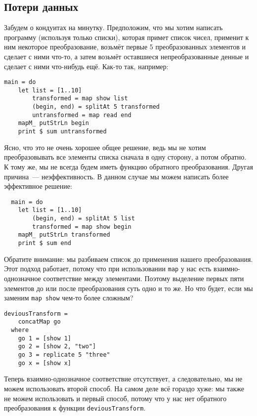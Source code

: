 \subsection{Потери данных} 
Забудем о кондуитах на минутку. Предположим, что мы хотим написать программу (используя 
только списки), которая примет список чисел, применит к ним некоторое преобразование,
возьмёт первые 5 преобразованных элементов и сделает с ними что-то, а затем возьмёт оставшиеся
непреобразованные денные и сделает с ними что-нибудь ещё. Как-то так, например:
\begin{lstlisting}
main = do
    let list = [1..10]
        transformed = map show list
        (begin, end) = splitAt 5 transformed
        untransformed = map read end
    mapM_ putStrLn begin
    print $ sum untransformed
\end{lstlisting}
Ясно, что это не очень хорошее общее решение, ведь мы не хотим
преобразовывать все элементы списка сначала в одну сторону, а потом обратно. К тому же,
мы не всегда будем иметь функцию обратного преобразования. Другая причина~---
неэффективность. В данном случае мы можем написать более эффективное решение:
\begin{lstlisting}
  main = do
    let list = [1..10]
        (begin, end) = splitAt 5 list
        transformed = map show begin
    mapM_ putStrLn transformed
    print $ sum end
\end{lstlisting}
Обратите внимание: мы разбиваем список до применения нашего преобразования. 
Этот подход работает, потому что при использовании \lstinline'map' у нас есть
 взаимно-однозначное соответствие между элементами. Поэтому выделение первых пяти 
 элементов до или после преобразования суть одно и то же. Но что будет, если мы 
 заменим \lstinline'map show' чем-то более сложным?
\begin{lstlisting}
deviousTransform =
    concatMap go
  where
    go 1 = [show 1]
    go 2 = [show 2, "two"]
    go 3 = replicate 5 "three"
    go x = [show x]
\end{lstlisting}
Теперь взаимно-однозначное соответствие отсутствует, а следовательно, мы не можем 
использовать второй способ. На самом деле всё гораздо хуже: мы также не можем 
использовать и первый способ, потому что у нас нет обратного преобразования к 
функции \lstinline'deviousTransform'.
 
